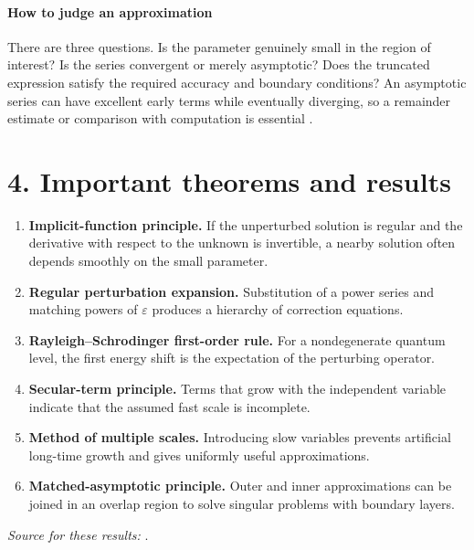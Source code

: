 \paragraph{How to judge an approximation}
There are three questions. Is the parameter genuinely small in the region of interest? Is the series convergent or merely asymptotic? Does the truncated expression satisfy the required accuracy and boundary conditions? An asymptotic series can have excellent early terms while eventually diverging, so a remainder estimate or comparison with computation is essential \cite{perturbation_ref1,perturbation_ref2}.

\section*{4. Important theorems and results}
\begin{enumerate}[leftmargin=*,itemsep=0.35em]
\item \textbf{Implicit-function principle.} If the unperturbed solution is regular and the derivative with respect to the unknown is invertible, a nearby solution often depends smoothly on the small parameter.

\item \textbf{Regular perturbation expansion.} Substitution of a power series and matching powers of $\varepsilon$ produces a hierarchy of correction equations.

\item \textbf{Rayleigh--Schrodinger first-order rule.} For a nondegenerate quantum level, the first energy shift is the expectation of the perturbing operator.

\item \textbf{Secular-term principle.} Terms that grow with the independent variable indicate that the assumed fast scale is incomplete.

\item \textbf{Method of multiple scales.} Introducing slow variables prevents artificial long-time growth and gives uniformly useful approximations.

\item \textbf{Matched-asymptotic principle.} Outer and inner approximations can be joined in an overlap region to solve singular problems with boundary layers.
\end{enumerate}
\noindent\emph{Source for these results:} \cite{perturbation_ref1}.

